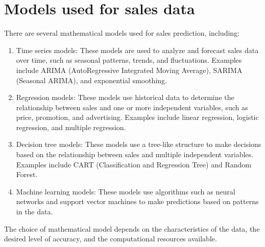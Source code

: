 \section{Models used for sales data} \label{sec:models}
There are several mathematical models used for sales prediction, including:
\\
\begin{enumerate}
    \item Time series models: These models are used to analyze and forecast sales data over time, such as seasonal patterns, trends, and fluctuations.
    Examples include ARIMA (AutoRegressive Integrated Moving Average), SARIMA (Seasonal ARIMA), and exponential smoothing.
    \item Regression models: These models use historical data to determine the relationship between sales and one or more independent variables,
    such as price, promotion, and advertising. Examples include linear regression, logistic regression, and multiple regression.
    \item Decision tree models: These models use a tree-like structure to make decisions based on the relationship between
    sales and multiple independent variables. Examples include CART (Classification and Regression Tree) and Random Forest.
    \item Machine learning models: These models use algorithms such as neural networks and support vector machines to make predictions
    based on patterns in the data.
\end{enumerate}
The choice of mathematical model depends on the characteristics of the data, the desired level of accuracy, and the computational resources available.
\\
